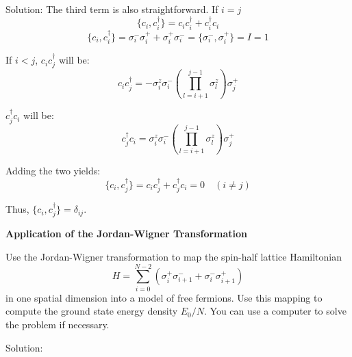 \begin{homeworkProblem}
\begin{callout}{Solution:}
The third term is also straightforward. If $i = j$
$$\{c_i, c_i^\dagger\} = c_i c_i^\dagger + c_i^\dagger c_i$$
$$\{c_i, c_i^\dagger\} = \sigma_i^- \sigma_i^+ + \sigma_i^+ \sigma_i^- = \{\sigma_i^-, \sigma_i^+\} = I = 1$$

If $i < j$, $c_i c_j^\dagger$ will be:
$$c_i c_j^\dagger = -\sigma_i^z \sigma_i^- \left( \prod_{l=i+1}^{j-1} \sigma_l^z \right) \sigma_j^+$$

$c_j^\dagger c_i$ will be:
$$c_j^\dagger c_i = \sigma_i^z \sigma_i^- \left( \prod_{l=i+1}^{j-1} \sigma_l^z \right) \sigma_j^+$$

Adding the two yields:
$$\{c_i, c_j^\dagger\} = c_i c_j^\dagger + c_j^\dagger c_i = 0 \quad (i \neq j)$$

Thus, $\{c_i, c_j^\dagger\} = \delta_{ij}$.

\end{callout}
\end{homeworkProblem}

\begin{homeworkProblem}
\textbf{Application of the Jordan-Wigner Transformation}

Use the Jordan-Wigner transformation to map the spin-half lattice Hamiltonian
\[
H = \sum_{i=0}^{N-2} \left( \sigma_i^{+} \sigma_{i+1}^{-} + \sigma_i^{-} \sigma_{i+1}^{+} \right)
\]
in one spatial dimension into a model of free fermions. Use this mapping to compute the ground state energy density $E_0/N$. You can use a computer to solve the problem if necessary.

\begin{callout}{Solution:}



\end{callout}
\end{homeworkProblem}
